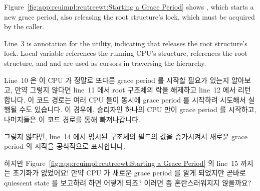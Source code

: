 Figure~\ref{fig:app:rcuimpl:rcutreewt:Starting a Grace Period}
shows , which starts a new grace period,
also releasing the root  structure's lock, which
must be acquired by the caller.

Line~3 is annotation for the  utility, indicating
that  releases the root 
structure's lock.
Local variable  references the running CPU's 
structure,  references the root  structure,
and  and  are used as cursors in traversing
the  hierarchy.
\fi

Line~10 은 이 CPU 가 정말로 또다른 grace period 를 시작할 필요가 있는지
알아보고, 만약 그렇지 않다면 line~11 에서 root  구조체의 락을
해제하고 line~12 에서 리턴합니다.
이 코드 경로는 여러 CPU 들이 동시에 grace period 를 시작하려 시도해서 실행될
수도 있습니다.
이 경우에, 승리자인 하나의 CPU 만이 grace period 를 시작하고, 나머지들은 이
코드 경로를 통해 빠져나갑니다.

그렇지 않다면, line~14 에서 명시된  구조체의  필드의
값을 증가시켜서 새로운 grace period 의 시작을 공식적으로 표시합니다.
\iffalse

Line~10 invokes \co{cpu_needs_another_gp()} to see if this CPU really
needs another grace period to be started, and if not, line~11
releases the root \co{rcu_node} structure's lock and line~12 returns.
This code path can be executed due to multiple CPUs concurrently
attempting to start a grace period.
In this case, the winner will start the grace period, and the losers
will exit out via this code path.

Otherwise, line~14 increments the specified \co{rcu_state} structure's
\co{->gpnum} field, officially marking the start of a new grace
period.
\fi

\QuickQuiz{}
	하지만
	Figure~\ref{fig:app:rcuimpl:rcutreewt:Starting a Grace Period}
	의 line~15 까지는 초기화가 없었어요!
	만약 CPU 가 새로운 grace period 를 알게 되었지만 곧바로 quiescent state
	를 보고하려 하면 어떻게 되죠?
	이러면 좀 혼란스러워지지 않을까요?
	\iffalse

